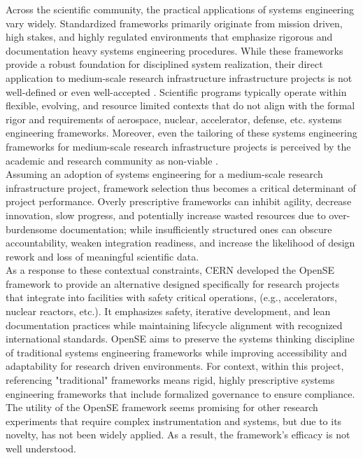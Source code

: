 Across the scientific community, the practical applications of systems engineering vary widely. 
Standardized frameworks primarily originate from mission driven, high stakes, and highly regulated environments that emphasize rigorous and documentation heavy systems engineering procedures. 
While these frameworks provide a robust foundation for disciplined system realization, their direct application to medium-scale research infrastructure infrastructure projects is not well-defined or even well-accepted \cite{r&dSE}. 
Scientific programs typically operate within flexible, evolving, and resource limited contexts that do not align with the formal rigor and requirements of aerospace, nuclear, accelerator, defense, etc. systems engineering frameworks.
Moreover, even the tailoring of these systems engineering frameworks for medium-scale research infrastructure projects is perceived by the academic and research community as non-viable \cite{r&dSE}. \\
Assuming an adoption of systems engineering for a medium-scale research infrastructure project, framework selection thus becomes a critical determinant of project performance. 
Overly prescriptive frameworks can inhibit agility, decrease innovation, slow progress, and potentially increase wasted resources due to over-burdensome documentation; 
while insufficiently structured ones can obscure accountability, weaken integration readiness, and increase the likelihood of design rework and loss of meaningful scientific data. \\
As a response to these contextual constraints, CERN developed the OpenSE framework \cite{cern2016opense} to provide an alternative designed specifically for research projects that integrate into facilities with safety critical operations, (e.g., accelerators, nuclear reactors, etc.). 
It emphasizes safety, iterative development, and lean documentation practices while maintaining lifecycle alignment with recognized international standards. 
OpenSE aims to preserve the systems thinking discipline of traditional systems engineering frameworks while improving accessibility and adaptability for research driven environments. 
For context, within this project, referencing "traditional" frameworks means rigid, highly prescriptive systems engineering frameworks that include formalized governance to ensure compliance.
The utility of the OpenSE framework seems promising for other research experiments that require complex instrumentation and systems, but due to its novelty, has not been widely applied. 
As a result, the framework's efficacy is not well understood.
